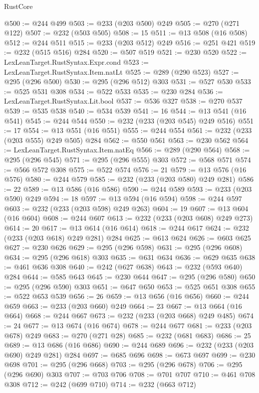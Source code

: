 \begin{lexlean}{RustCore}
\begin{coremodule}
@500 := @244 @499
@503 := @233 (@203 @500) @249
@505 := @270 (@271 @122)
@507 := @232 (@503 @505)
@508 := 15
@511 := @13 @508 (@16 @508)
@512 := @244 @511
@515 := @233 (@203 @512) @249
@516 := @251 @421
@519 := @232 (@515 @516) @284
@520 := @507 @519
@521 := @230 @520
@522 := LexLeanTarget.RustSyntax.Expr.cond
@523 := LexLeanTarget.RustSyntax.Item.natLt
@525 := @289 (@290 @523)
@527 := @295 (@296 @500)
@530 := @295 (@296 @512) @303
@531 := @527 @530
@533 := @525 @531 @308
@534 := @522 @533
@535 := @230 @284
@536 := LexLeanTarget.RustSyntax.Lit.bool
@537 := @536 @327
@538 := @270 @537
@539 := @535 @538
@540 := @534 @539
@541 := 16
@544 := @13 @541 (@16 @541)
@545 := @244 @544
@550 := @232 (@233 (@203 @545) @249 @516)
@551 := 17
@554 := @13 @551 (@16 @551)
@555 := @244 @554
@561 := @232 (@233 (@203 @555) @249 @505) @284
@562 := @550 @561
@563 := @230 @562
@564 := LexLeanTarget.RustSyntax.Item.natEq
@566 := @289 (@290 @564)
@568 := @295 (@296 @545)
@571 := @295 (@296 @555) @303
@572 := @568 @571
@574 := @566 @572 @308
@575 := @522 @574
@576 := 21
@579 := @13 @576 (@16 @576)
@580 := @244 @579
@585 := @232 (@233 (@203 @580) @249 @281)
@586 := 22
@589 := @13 @586 (@16 @586)
@590 := @244 @589
@593 := @233 (@203 @590) @249
@594 := 18
@597 := @13 @594 (@16 @594)
@598 := @244 @597
@603 := @232 (@233 (@203 @598) @249 @263)
@604 := 19
@607 := @13 @604 (@16 @604)
@608 := @244 @607
@613 := @232 (@233 (@203 @608) @249 @273)
@614 := 20
@617 := @13 @614 (@16 @614)
@618 := @244 @617
@624 := @232 (@233 (@203 @618) @249 @281) @284
@625 := @613 @624
@626 := @603 @625
@627 := @230 @626
@629 := @295 (@296 @598)
@631 := @295 (@296 @608)
@634 := @295 (@296 @618) @303
@635 := @631 @634
@636 := @629 @635
@638 := @461 @636 @308
@640 := @242 (@627 @638)
@643 := @232 (@593 @640) @284
@644 := @585 @643
@645 := @230 @644
@647 := @295 (@296 @580)
@650 := @295 (@296 @590) @303
@651 := @647 @650
@653 := @525 @651 @308
@655 := @522 @653 @539
@656 := 26
@659 := @13 @656 (@16 @656)
@660 := @244 @659
@663 := @233 (@203 @660) @249
@664 := 23
@667 := @13 @664 (@16 @664)
@668 := @244 @667
@673 := @232 (@233 (@203 @668) @249 @485)
@674 := 24
@677 := @13 @674 (@16 @674)
@678 := @244 @677
@681 := @233 (@203 @678) @249
@683 := @270 (@271 @28)
@685 := @232 (@681 @683)
@686 := 25
@689 := @13 @686 (@16 @686)
@690 := @244 @689
@696 := @232 (@233 (@203 @690) @249 @281) @284
@697 := @685 @696
@698 := @673 @697
@699 := @230 @698
@701 := @295 (@296 @668)
@703 := @295 (@296 @678)
@706 := @295 (@296 @690) @303
@707 := @703 @706
@708 := @701 @707
@710 := @461 @708 @308
@712 := @242 (@699 @710)
@714 := @232 (@663 @712)

\end{coremodule}
\end{lexlean}
